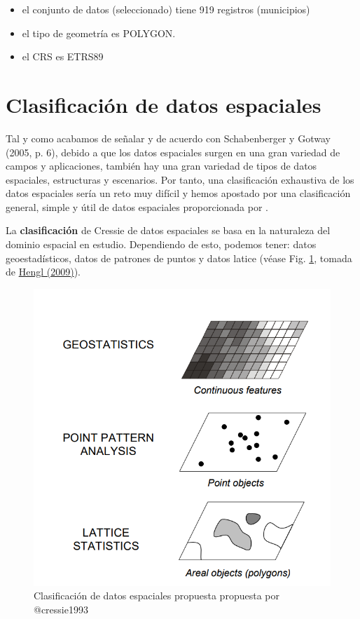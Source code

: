 \documentclass[
]{book}
\providecommand{\tightlist}{%
  \setlength{\itemsep}{0pt}\setlength{\parskip}{0pt}}
\begin{document}
\begin{itemize}
\tightlist
\item
  el conjunto de datos (seleccionado) tiene 919 registros (municipios)
\item
  el tipo de geometría es POLYGON.
\item
  el CRS es ETRS89
\end{itemize}

\hypertarget{clasificaciuxf3n-de-datos-espaciales}{%
\section{Clasificación de datos espaciales}\label{clasificaciuxf3n-de-datos-espaciales}}

Tal y como acabamos de señalar y de acuerdo con Schabenberger y Gotway (2005, p.
6), debido a que los datos espaciales surgen en una gran variedad de campos y
aplicaciones, también hay una gran variedad de tipos de datos espaciales,
estructuras y escenarios. Por tanto, una clasificación exhaustiva de los datos
espaciales sería un reto muy difícil y hemos apostado por una clasificación
general, simple y útil de datos espaciales proporcionada por \citet{cressie1993}.

La \textbf{clasificación} de Cressie de datos espaciales se basa en la naturaleza del
dominio espacial en estudio. Dependiendo de esto, podemos tener: datos
geoestadísticos, datos de patrones de puntos y datos latice (véase Fig.
\ref{fig:hengl-cressie}, tomada de \href{http://spatial-analyst.net/book/system/files/Hengl_2009_GEOSTATe2c1w.pdf}{Hengl
(2009)}).

\begin{figure}

{\centering \includegraphics[width=0.6\linewidth]{img/hengl_cressie_clases} 

}

\caption{Clasificación de datos espaciales propuesta propuesta por @cressie1993}\label{fig:hengl-cressie}
\end{figure}
\end{document}
